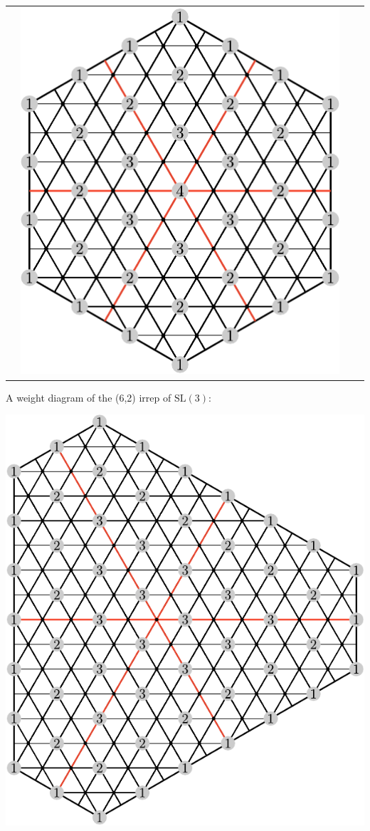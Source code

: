 \documentclass[11pt,oneside]{article}
\newcommand{\SL}{\mathrm{SL}}
\begin{document}
\begin{center}
\begin{tabular}{ c c c c }
& \includegraphics[scale=0.6]{images/sl3_weights_33.pdf} \\
\end{tabular}
\end{center}


A weight diagram of the (6,2) irrep of $\SL(3)$:
\begin{center}
\includegraphics[scale=0.8]{images/sl3_weights_62.pdf}
\end{center}
\end{document}
